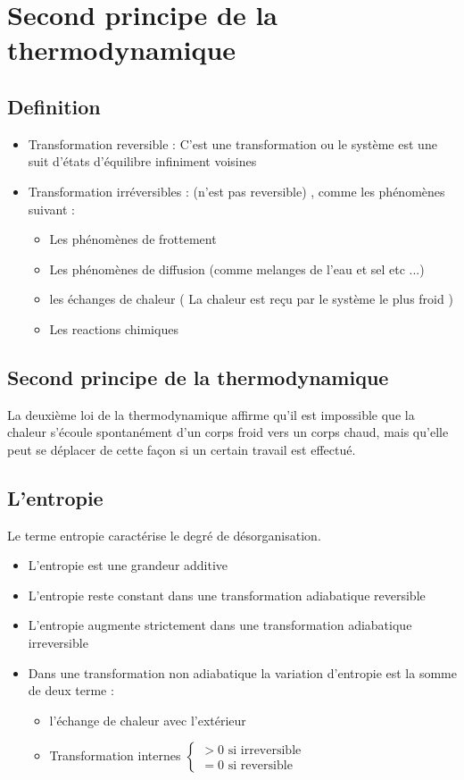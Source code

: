 \documentclass[12pt,oneside]{book}
\begin{document}
\chapter{Second principe de la thermodynamique}
\section{Definition }
\begin{itemize}
    \item Transformation reversible : C'est une transformation ou le système est une suit d’états d’équilibre infiniment voisines
    \item Transformation irréversibles : (n'est pas reversible) , comme les phénomènes suivant :
          \begin{itemize}
              \item Les phénomènes de frottement
              \item Les phénomènes de diffusion (comme melanges de l'eau et sel etc ...)
              \item les échanges de chaleur ( La chaleur est reçu par le système le plus froid )
              \item Les reactions chimiques
          \end{itemize}
\end{itemize}
\section{Second principe de la thermodynamique}
\begin{center}
    La deuxième loi de la thermodynamique affirme qu'il est impossible que la chaleur s'écoule spontanément d'un corps froid vers un corps chaud,
    mais qu'elle peut se déplacer de cette façon si un certain travail est effectué.
\end{center}
\section{L'entropie}
Le terme entropie caractérise le degré de désorganisation.
\begin{itemize}
    \item L'entropie est une grandeur additive
    \item L'entropie reste constant dans une transformation adiabatique reversible
    \item L'entropie augmente strictement dans une transformation adiabatique irreversible
    \item Dans une transformation non adiabatique la variation d'entropie est la somme de deux terme :
          \begin{itemize}
              \item l’échange de chaleur avec l’extérieur
              \item Transformation internes $\begin{cases}
                            > 0 \text{ si irreversible} \\
                            = 0 \text{ si reversible}
                        \end{cases}$
          \end{itemize}
\end{itemize}
\end{document}
